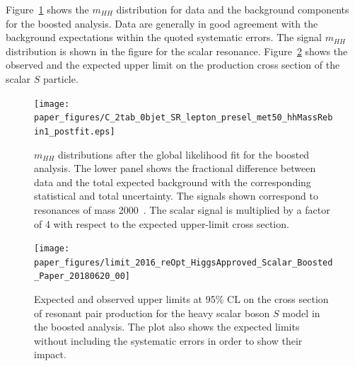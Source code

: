 Figure~\ref{fig:boosted_postfit_mhh} shows the $m_{HH}$ distribution for
data and the background components for the boosted analysis.
Data are generally in good agreement with the background expectations within the quoted systematic errors.
The signal $m_{HH}$ distribution is shown in the figure for  the scalar resonance.
Figure~\ref{fig:boosted_only_limits} shows the observed and the expected
upper limit on the production cross section of the scalar $S$ particle.

\begin{figure}
\begin{center}
\texttt{[image: paper\_figures/C\_2tab\_0bjet\_SR\_lepton\_presel\_met50\_hhMassRebin1\_postfit.eps]}
 
\end{center}
\caption[$m_{HH}$ distributions after the global likelihood fit for the boosted analysis]{$m_{HH}$ distributions after the global likelihood fit for the boosted analysis. The lower panel shows the fractional difference between data and the total expected background with the corresponding statistical and total uncertainty.  The signals shown correspond to resonances of mass 2000~\gev. The scalar signal is multiplied by a factor of 4 with respect to the expected upper-limit cross section.}%
  \label{fig:boosted_postfit_mhh}
\end{figure}
\FloatBarrier
 
\begin{figure}[!h]
\begin{center}
\texttt{[image: paper\_figures/limit\_2016\_reOpt\_HiggsApproved\_Scalar\_Boosted\_Paper\_20180620\_00]}
\caption[Expected and observed upper limits at 95\% CL on the cross section of resonant pair production for the heavy scalar boson $S$ model in the boosted analysis]{Expected and observed upper limits at 95\% CL on the cross section of resonant pair production for the heavy scalar boson $S$ model in the boosted analysis. The plot also shows the expected limits without including the systematic errors in order to show their impact.
          }
 
\label{fig:boosted_only_limits}
\end{center}
\end{figure}
